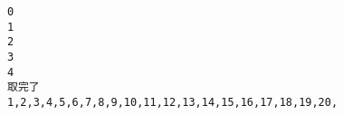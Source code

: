 \documentclass[11pt]{article}
\makeatletter
\newcommand{\boxspacing}{\kern\kvtcb@left@rule\kern\kvtcb@boxsep}
\newcommand{\prompt}[4]{
        \ttfamily\llap{{\color{#2}[#3]:\hspace{3pt}#4}}\vspace{-\baselineskip}
    }
\makeatother
\begin{document}
    \begin{Verbatim}[commandchars=\\\{\}]
0
1
2
3
4
取完了
1,2,3,4,5,6,7,8,9,10,11,12,13,14,15,16,17,18,19,20,
    \end{Verbatim}

    \begin{tcolorbox}[breakable, size=fbox, boxrule=1pt, pad at break*=1mm,colback=cellbackground, colframe=cellborder]
\prompt{In}{incolor}{ }{\boxspacing}
\begin{Verbatim}[commandchars=\\\{\}]

\end{Verbatim}
\end{tcolorbox}


    
    
    
\end{document}
